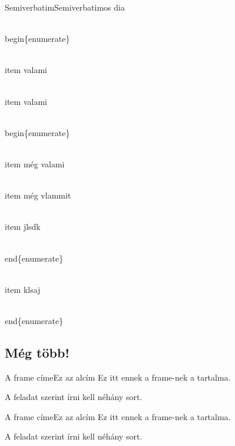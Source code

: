 \documentclass[aspectratio=169, bigger, xcolor={table}]{beamer}
\begin{document}
\begin{frame}{Semiverbatim}{Semiverbatimos dia}
\begin{semiverbatim}
\color{red}
\\begin\{enumerate\}

\\item valami

\\item valami

\color{blue}

\\begin\{enumerate\}

\\item még valami

\\item még vlammit

\\item jlsdk

\\end\{enumerate\}

\color{red}

\\item klsaj

\\end\{enumerate\}
\color{black}
\end{semiverbatim}
\end{frame}

\subsection{Még több!}
\begin{frame}{A frame címe}{Ez az alcím}
Ez itt ennek a frame-nek a tartalma.

A feladat szerint írni kell néhány sort.
\end{frame}

\begin{frame}{A frame címe}{Ez az alcím}
Ez itt ennek a frame-nek a tartalma.

A feladat szerint írni kell néhány sort.
\end{frame}
\end{document}
